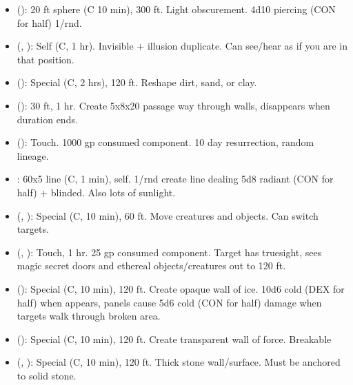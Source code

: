 \begin{itemize}
	\item {} (): 20 ft sphere (C 10 min), 300 ft. Light obscurement. 4d10 piercing (CON for half) 1/rnd.
	\item {} (, ): Self (C, 1 hr). Invisible + illusion duplicate. Can see/hear as if you are in that position. 
	\item {} (): Special (C, 2 hrs), 120 ft. Reshape dirt, sand, or clay.
	\item {} (): 30 ft, 1 hr. Create 5x8x20 passage way through walls, disappears when duration ends.
	\item {} (): Touch. 1000 gp consumed component. 10 day resurrection, random lineage.
	\item {} : 60x5 line (C, 1 min), self. 1/rnd create line dealing 5d8 radiant (CON for half) + blinded. Also lots of sunlight.
	\item {} (, ): Special (C, 10 min), 60 ft. Move creatures and objects. Can switch targets.
	\item {} (, ): Touch, 1 hr. 25 gp consumed component. Target has truesight, sees magic secret doors and ethereal objects/creatures out to 120 ft.
	\item {} (): Special (C, 10 min), 120 ft. Create opaque wall of ice. 10d6 cold (DEX for half) when appears, panels cause 5d6 cold (CON for half) damage when targets walk through broken area. 
	\item {} (): Special (C, 10 min), 120 ft. Create transparent wall of force. Breakable
	\item {} (, ): Special (C, 10 min), 120 ft. Thick stone wall/surface. Must be anchored to solid stone.
\end{itemize}

